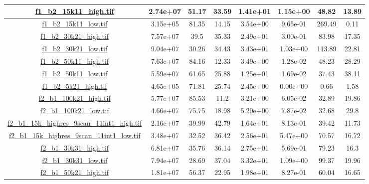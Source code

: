 \begin{table}[h]
\begin{adjustwidth}{-1cm}{}
\begin{tabular}{ |c |c |c |c |c |c |c |c |}
{\hyperlink{histf1_b2_15k11_high}{\color{blue}f1\_b2\_15k11\_high.tif}} & 2.74e+07 & 51.17 & 33.59 & 1.41e+01 & 1.15e+00 & 48.82 & 13.89\\ \hline
{\hyperlink{histf1_b2_15k11_low}{\color{blue}f1\_b2\_15k11\_low.tif}} & 3.15e+05 & 81.35 & 14.15 & 3.54e+00 & 9.65e-01 & 269.49 & 0.11\\ \hline
{\hyperlink{histf1_b2_30k21_high}{\color{blue}f1\_b2\_30k21\_high.tif}} & 7.57e+07 & 39.5 & 35.33 & 2.49e+01 & 3.00e-01 & 83.98 & 17.35\\ \hline
{\hyperlink{histf1_b2_30k21_low}{\color{blue}f1\_b2\_30k21\_low.tif}} & 9.04e+07 & 30.26 & 34.43 & 3.43e+01 & 1.03e+00 & 113.89 & 22.81\\ \hline
{\hyperlink{histf1_b2_50k11_high}{\color{blue}f1\_b2\_50k11\_high.tif}} & 7.63e+07 & 84.16 & 12.33 & 3.49e+00 & 1.28e-02 & 48.23 & 28.29\\ \hline
{\hyperlink{histf1_b2_50k11_low}{\color{blue}f1\_b2\_50k11\_low.tif}} & 5.59e+07 & 61.65 & 25.88 & 1.25e+01 & 1.69e-02 & 37.43 & 38.11\\ \hline
{\hyperlink{histf1_b2_5k21_high}{\color{blue}f1\_b2\_5k21\_high.tif}} & 4.65e+05 & 71.81 & 25.74 & 2.45e+00 & 0.00e+00 & 0.66 & 1.58\\ \hline
{\hyperlink{histf2_b1_100k21_high}{\color{blue}f2\_b1\_100k21\_high.tif}} & 5.77e+07 & 85.53 & 11.2 & 3.21e+00 & 6.05e-02 & 32.89 & 19.86\\ \hline
{\hyperlink{histf2_b1_100k21_low}{\color{blue}f2\_b1\_100k21\_low.tif}} & 4.66e+07 & 75.75 & 18.98 & 5.20e+00 & 7.87e-02 & 32.68 & 29.8\\ \hline
{\hyperlink{histf2_b1_15k_highres_9scan_11int1_high}{\color{blue}f2\_b1\_15k\_highres\_9scan\_11int1\_high.tif}} & 2.16e+07 & 39.99 & 42.79 & 1.64e+01 & 8.13e-01 & 39.42 & 11.73\\ \hline
{\hyperlink{histf2_b1_15k_highres_9scan_11int1_low}{\color{blue}f2\_b1\_15k\_highres\_9scan\_11int1\_low.tif}} & 3.48e+07 & 32.52 & 36.42 & 2.56e+01 & 5.47e+00 & 70.57 & 16.72\\ \hline
{\hyperlink{histf2_b1_30k31_high}{\color{blue}f2\_b1\_30k31\_high.tif}} & 6.81e+07 & 35.76 & 36.14 & 2.75e+01 & 5.69e-01 & 79.23 & 16.3\\ \hline
{\hyperlink{histf2_b1_30k31_low}{\color{blue}f2\_b1\_30k31\_low.tif}} & 7.94e+07 & 28.69 & 37.04 & 3.32e+01 & 1.09e+00 & 99.37 & 19.96\\ \hline
{\hyperlink{histf2_b1_50k21_high}{\color{blue}f2\_b1\_50k21\_high.tif}} & 1.81e+07 & 56.37 & 22.95 & 1.98e+01 & 8.27e-01 & 60.04 & 16.65\\ \hline

\end{tabular}
\end{adjustwidth}
\end{table}
